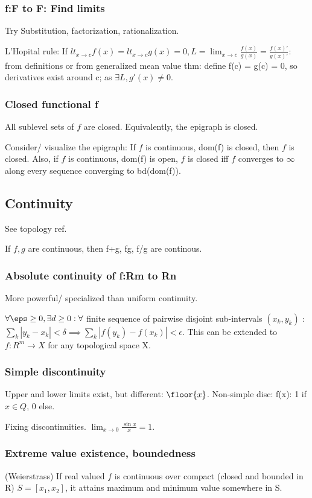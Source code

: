 \documentclass[oneside, article]{memoir}
\begin{document}
\subsubsection{f:F to F: Find limits}
Try Substitution, factorization, rationalization.

L'Hopital rule: If $lt_{x \to c}f(x) = lt_{x \to c}g(x) = 0, L = \lim_{x\to c}\frac{f(x)}{g(x)} = \frac{f(x)'}{g(x)'}$: from definitions or from generalized mean value thm: define f(c) = g(c) = 0, so derivatives exist around c; as $\exists L, g'(x) \neq 0$.

\subsubsection{Closed functional f}
All sublevel sets of $f$ are closed. Equivalently, the epigraph is closed. \why

Consider/ visualize the epigraph: If $f$ is continuous, dom(f) is closed, then $f$ is closed. Also, if $f$ is continuous, dom(f) is open, $f$ is closed iff $f$ converges to $\infty$ along every sequence converging to bd(dom(f)). \why

\subsection{Continuity}
See topology ref.

If $f, g$ are continuous, then f+g, fg, f/g are continous.

\subsubsection{Absolute continuity of f:Rm to Rn}
More powerful/ specialized than uniform continuity.

$\forall \eps \geq 0, \exists d \geq 0: \forall $ finite sequence of pairwise disjoint sub-intervals $(x_k, y_k)$ : $\sum_{k} | y_k - x_k| < \delta \implies \sum_{k} | f(y_k) - f(x_k) | < \epsilon.$ This can be extended to $f:R^{m} \to X$ for any topological space X.
 

\subsubsection{Simple discontinuity}
Upper and lower limits exist, but different: $\floor{x}$. Non-simple disc: f(x): 1 if $x \in Q$, 0 else.

Fixing discontinuities. $\lim_{x \to 0} \frac{\sin x}{x} = 1$.

\subsubsection{Extreme value existence, boundedness}
(Weierstrass) If real valued $f$ is continuous over compact (closed and bounded in R) $S = [x_{1}, x_{2}]$, it attains maximum and minimum value somewhere in S.
\end{document}
